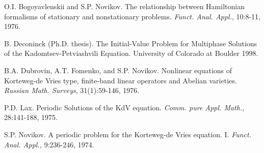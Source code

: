 \documentclass[12pt, a4paper]{article}
\begin{document}
\newpage

\begin{thebibliography}{99}


 O.I. Bogoyavlenskii and S.P. Novikov. The relationship
  between Hamiltonian formalisms of stationary and nonstationary
  problems. \emph{Funct. Anal. Appl.}, 10:8-11, 1976.

 B. Deconinck (Ph.D. thesis). The Initial-Value Problem
  for Multiphase Solutions of the Kadomtsev-Petviashvili
  Equation. University of Colorado at Boulder 1998.

 B.A. Dubrovin, A.T. Fomenko, and S.P. Novikov. Nonlinear
  equations of Korteweg-de Vries type, finite-band linear operators and
  Abelian varieties. \emph{Russian Math. Surveys}, 31(1):59-146, 1976.

 P.D. Lax. Periodic Solutions of the KdV
  equation. \emph{Comm. pure Appl. Math.}, 28:141-188, 1975.

 S.P. Novikov. A periodic problem for the Korteweg-de Vries
  equation. I. \emph{Funct. Anal. Appl.,} 9:236-246, 1974.

\end{thebibliography}
\end{document}
